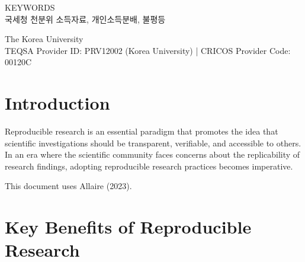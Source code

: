 \documentclass[
  a4paper,
  oneside,
  open=any]{scrbook}
\renewcommand*\contentsname{Table of contents}
\newcommand\contentsname{Table of contents}
\begin{document}
\begin{frontmatter}
\begin{titlepage}
\begin{minipage}[b][\textheight][s]{\textwidth}
\begin{titlepagebox}
  {\textcolor{anugold}{\MakeUppercase{Keywords}}}\\
  국세청 천분위 소득자료, 개인소득분배, 불평등

  \end{titlepagebox}

  \vspace{2\baselineskip}






  \vfill



  \vspace{1\baselineskip}

  The Korea University\\{\footnotesize TEQSA Provider ID: PRV12002 (Korea University) | CRICOS Provider Code: 00120C}

  \end{minipage}
  \restoregeometry

  \end{titlepage}
  \end{frontmatter}

\restoregeometry

\cleardoublepage
{}


\renewcommand*\contentsname{Table of contents}
{
\setcounter{tocdepth}{2}
\tableofcontents
}

\mainmatter
\section{Introduction}\label{introduction}

Reproducible research is an essential paradigm that promotes the idea
that scientific investigations should be transparent, verifiable, and
accessible to others. In an era where the scientific community faces
concerns about the replicability of research findings, adopting
reproducible research practices becomes imperative.

This document uses Allaire (2023).

\section{Key Benefits of Reproducible
Research}\label{key-benefits-of-reproducible-research}
\end{document}
